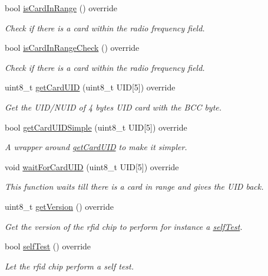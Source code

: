 \begin{DoxyCompactItemize}
bool \mbox{\hyperlink{class_m_f_r_c522_a019f76569bddf9c2f9f94eca13a618d7}{is\+Card\+In\+Range}} () override
\begin{DoxyCompactList}\small\item\em Check if there is a card within the radio frequency field. \end{DoxyCompactList}\item 
bool \mbox{\hyperlink{class_m_f_r_c522_a29ce0dd04495f9352e32ada5ecc5fd03}{is\+Card\+In\+Range\+Check}} () override
\begin{DoxyCompactList}\small\item\em Check if there is a card within the radio frequency field. \end{DoxyCompactList}\item 
uint8\+\_\+t \mbox{\hyperlink{class_m_f_r_c522_ad3c7ab4c70988e80c400f36f724a12b7}{get\+Card\+U\+ID}} (uint8\+\_\+t U\+ID\mbox{[}5\mbox{]}) override
\begin{DoxyCompactList}\small\item\em Get the U\+I\+D/\+N\+U\+ID of 4 bytes U\+ID card with the B\+CC byte. \end{DoxyCompactList}\item 
bool \mbox{\hyperlink{class_m_f_r_c522_a33c20be6030f635d986984db4999a1eb}{get\+Card\+U\+I\+D\+Simple}} (uint8\+\_\+t U\+ID\mbox{[}5\mbox{]}) override
\begin{DoxyCompactList}\small\item\em A wrapper around \mbox{\hyperlink{class_m_f_r_c522_ad3c7ab4c70988e80c400f36f724a12b7}{get\+Card\+U\+ID}} to make it simpler. \end{DoxyCompactList}\item 
void \mbox{\hyperlink{class_m_f_r_c522_aeb05c83c2d139eb2c57f400399982691}{wait\+For\+Card\+U\+ID}} (uint8\+\_\+t U\+ID\mbox{[}5\mbox{]}) override
\begin{DoxyCompactList}\small\item\em This function waits till there is a card in range and gives the U\+ID back. \end{DoxyCompactList}\item 
uint8\+\_\+t \mbox{\hyperlink{class_m_f_r_c522_a25fb0a50bf7db51ab9c5bc2ff4fa84e3}{get\+Version}} () override
\begin{DoxyCompactList}\small\item\em Get the version of the rfid chip to perform for instance a \mbox{\hyperlink{class_m_f_r_c522_adcc4f5eb212c1a94e462eab459bd685e}{self\+Test}}. \end{DoxyCompactList}\item 
bool \mbox{\hyperlink{class_m_f_r_c522_adcc4f5eb212c1a94e462eab459bd685e}{self\+Test}} () override
\begin{DoxyCompactList}\small\item\em Let the rfid chip perform a self test. \end{DoxyCompactList}\end{DoxyCompactItemize}
